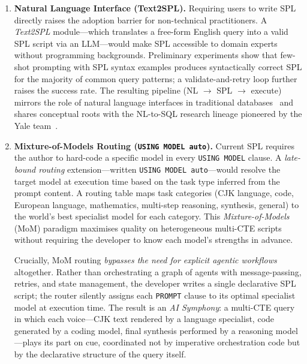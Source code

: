 \documentclass[11pt,a4paper]{article}
\begin{document}
\begin{enumerate}

  \item \textbf{Natural Language Interface (Text2SPL).}
  Requiring users to write SPL directly raises the adoption barrier for
  non-technical practitioners.  A \emph{Text2SPL} module---which translates a
  free-form English query into a valid SPL script via an LLM---would make SPL
  accessible to domain experts without programming backgrounds.  Preliminary
  experiments show that few-shot prompting with SPL syntax examples produces
  syntactically correct SPL for the majority of common query patterns; a
  validate-and-retry loop further raises the success rate.  The resulting
  pipeline (NL $\to$ SPL $\to$ execute) mirrors the role of natural language
  interfaces in traditional databases~\citep{androutsopoulos1995natural} and shares
  conceptual roots with the NL-to-SQL research lineage pioneered by the Yale
  team~\citep{yu2018spider,yu2019sparc}.

  \item \textbf{Mixture-of-Models Routing (\texttt{USING MODEL auto}).}
  Current SPL requires the author to hard-code a specific model in every
  \texttt{USING MODEL} clause.  A \emph{late-bound routing} extension---written
  \texttt{USING MODEL auto}---would resolve the target model at execution time
  based on the task type inferred from the prompt content.  A routing table maps
  task categories (CJK language, code, European language, mathematics,
  multi-step reasoning, synthesis, general) to the world's best specialist
  model for each category.  This \emph{Mixture-of-Models} (MoM) paradigm
  maximises quality on heterogeneous multi-CTE scripts without requiring the
  developer to know each model's strengths in advance.

  Crucially, MoM routing \emph{bypasses the need for explicit agentic workflows}
  altogether.  Rather than orchestrating a graph of agents with message-passing,
  retries, and state management, the developer writes a single declarative SPL
  script; the router silently assigns each \texttt{PROMPT} clause to its optimal
  specialist model at execution time.  The result is an \emph{AI Symphony}:
  a multi-CTE query in which each voice---CJK text rendered by a language
  specialist, code generated by a coding model, final synthesis performed by a
  reasoning model---plays its part on cue, coordinated not by imperative
  orchestration code but by the declarative structure of the query itself.


\end{enumerate}
\end{document}
